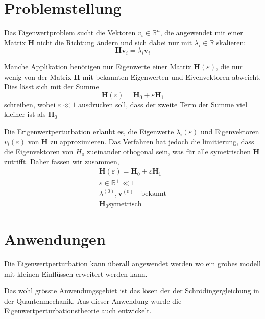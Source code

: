 %
%
%
\section{Problemstellung
\label{ew:section:problemstellung}}

Das Eigenwertproblem sucht die Vektoren $v_i \in \mathbb {R}^{n} $, die angewendet mit einer Matrix $\bm H$ nicht die Richtung ändern und sich dabei nur mit $\lambda_i \in \mathbb R$ skalieren:
\begin{equation} 
    \bm H \bm v_i = \lambda_i \bm v_i
\end{equation} \label{ew:eq:eig}

Manche Applikation benötigen nur Eigenwerte einer Matrix $\bm H(\varepsilon)$, die nur wenig von der Matrix $\bm H$ mit bekannten Eigenwerten und Eivenvektoren abweicht.
Dies lässt sich mit der Summe
\begin{equation}
    \bm H(\varepsilon) = \bm H_0 + \varepsilon \bm H_1
\end{equation}
schreiben, wobei $\varepsilon \ll 1 $ ausdrücken soll, dass der zweite Term der Summe viel kleiner ist als $\bm H_0$

Die Erigenwertperturbation erlaubt es, die Eigenwerte $\lambda_i(\varepsilon)$ und Eigenvektoren  $v_i(\varepsilon)$ von $\bm H$ zu approximieren.
Das Verfahren hat jedoch die limitierung, dass die Eigenvektoren von $H_0$ zueinander othogonal sein, was für alle symetrischen $\bm H$ zutrifft.
Daher fassen wir zusammen,
\begin{gather*}
    \bm H(\varepsilon) = \bm H_0 + \varepsilon \bm H_1 \\
    \varepsilon \in \mathbb{R^+} \ll 1 \\
    \lambda^{(0)}, \bm v^{(0)} \quad \text{bekannt} \\
    \bm H_0 \text{symetrisch}
\end{gather*} %



\section{Anwendungen}

Die Eigenwertperturbation kann überall angewendet werden wo ein grobes modell mit kleinen Einflüssen erweitert werden kann.

Das wohl grösste Anwendungsgebiet ist das lösen der der Schrödingergleichung in der Quantenmechanik.
Aus dieser Anwendung wurde die Eigenwertperturbationstheorie auch entwickelt. %
                
